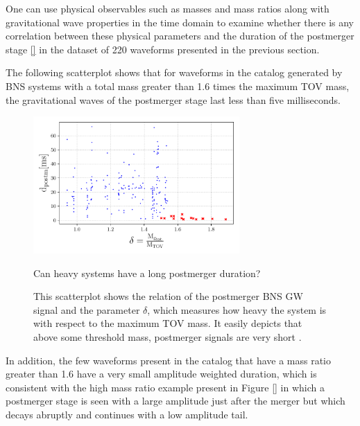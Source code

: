 \FloatBarrier 


One can use physical observables such as masses and mass ratios along with gravitational wave properties in the time domain to examine whether there is any correlation between these physical parameters and the duration of the postmerger stage \ref{} in the dataset of 220 waveforms presented in the previous section. 

The following scatterplot shows that for waveforms in the catalog generated by BNS systems with a total mass greater than 1.6 times the maximum TOV mass, the gravitational waves of the postmerger stage last less than five milliseconds.

\begin{figure}[hbt!]
\begin{center}
\includegraphics[width=0.7\textwidth, angle=0]{images/Data_analysis/results/res0.pdf}
\captionsetup{width=0.8\textwidth}
\caption{Can heavy systems have a long postmerger duration?}
\caption*{This scatterplot shows the relation of the postmerger BNS GW signal and the parameter $\delta$, which measures how heavy the system is with respect to the maximum TOV mass. It easily depicts that above some threshold mass, postmerger signals are very short \cite{Kashyap_2022}.}
\label{heavy systems}
\end{center}
\end{figure}


In addition, the few waveforms present in the catalog that have a mass ratio greater than 1.6 have a very small amplitude weighted duration, which is consistent with the high mass ratio example present in Figure \ref{} in which a postmerger stage is seen with a large amplitude just after the merger but which decays abruptly and continues with a low amplitude tail.


